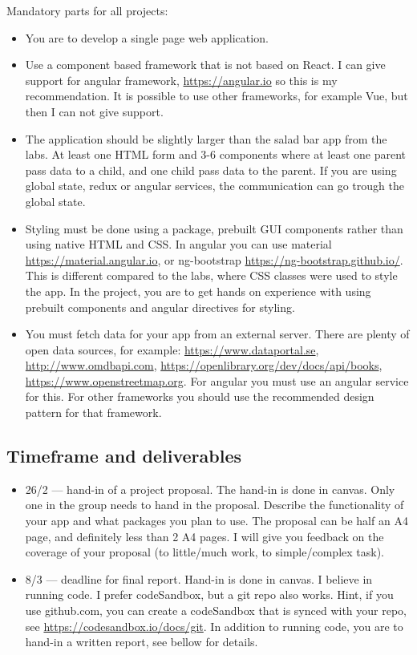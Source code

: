 \documentclass[fleqn, article, a4paper]{memoir}
\begin{document}
\noindent Mandatory parts for all projects:
\begin{itemize}\firmlist
\item You are to develop a single page web application.
\item Use a component based framework that is not based on React. I can give support for angular framework, \url{https://angular.io} so this is my recommendation. It is possible to use other frameworks, for example Vue, but then I can not give support.
\item The application should be slightly larger than the salad bar app from the labs. At least one HTML form and 3-6 components where at least one parent pass data to a child, and one child pass data to the parent. If you are using global state, redux or angular services, the communication can go trough the global state.
\item Styling must be done using a package, prebuilt GUI components rather than using native HTML and CSS. In angular you can use material \url{https://material.angular.io}, or ng-bootstrap \url{https://ng-bootstrap.github.io/}. This is different compared to the labs, where CSS classes were used to style the app. In the project, you are to get hands on experience with using prebuilt components and angular directives for styling.
\item You must fetch data for your app from an external server. There are plenty of open data sources, for example: \url{https://www.dataportal.se}, \url{http://www.omdbapi.com}, \url{https://openlibrary.org/dev/docs/api/books}, \url{https://www.openstreetmap.org}. For angular you must use an angular service for this. For other frameworks you should use the recommended design pattern for that framework.
\end{itemize}

\subsection*{Timeframe and deliverables}

\begin{itemize}
\item 26/2 --- hand-in of a project proposal. The hand-in is done in canvas. Only one in the group needs to hand in the proposal. Describe the functionality of your app and what packages you plan to use. The proposal can be half an A4 page, and definitely less than 2 A4 pages. I will give you feedback on the coverage of your proposal (to little/much work, to simple/complex task).
\item 8/3 --- deadline for final report. Hand-in is done in canvas. I believe in running code. I prefer codeSandbox, but a git repo also works. Hint, if you use github.com, you can create a codeSandbox that is synced with your repo, see \url{https://codesandbox.io/docs/git}. In addition to running code, you are to hand-in a written report, see bellow for details.
\end{itemize}
\end{document}
